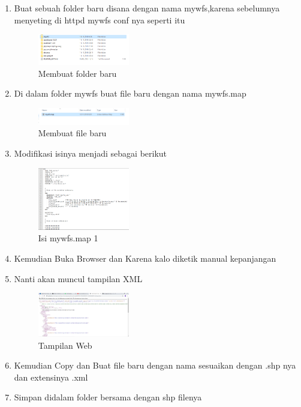 \begin{enumerate}
  \item Buat sebuah folder baru disana dengan nama mywfs,karena sebelumnya menyeting di httpd mywfs conf nya seperti itu
  \hfill\break
    \begin{figure}[H]
		\includegraphics[width=4cm]{figures/Tugas4/1174077/15.png}
		\centering
		\caption{Membuat folder baru}
    \end{figure}
  \item Di dalam folder mywfs buat file baru dengan nama mywfs.map
  \hfill\break
    \begin{figure}[H]
		\includegraphics[width=4cm]{figures/Tugas4/1174077/16.png}
		\centering
		\caption{Membuat file baru}
    \end{figure}
  \item Modifikasi isinya menjadi sebagai berikut
  \hfill\break
    \begin{figure}[H]
		\includegraphics[width=4cm]{figures/Tugas4/1174077/17.png}
		\centering
		\caption{Isi mywfs.map 1}
    \end{figure}
  \item Kemudian Buka Browser dan Karena kalo diketik manual kepanjangan
  \item Nanti akan muncul tampilan XML
  \hfill\break
    \begin{figure}[H]
		\includegraphics[width=4cm]{figures/Tugas4/1174077/18.png}
		\centering
		\caption{Tampilan Web}
    \end{figure}
  \item Kemudian Copy dan Buat file baru dengan nama sesuaikan dengan .shp nya dan extensinya .xml
  \item Simpan didalam folder bersama dengan shp filenya

\end{enumerate}
